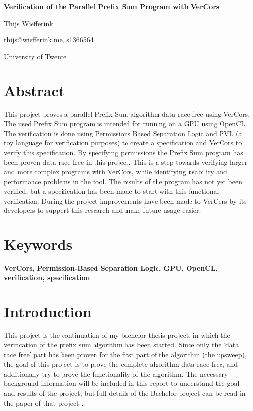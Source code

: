 \documentclass[a4paper]{article}
\begin{document}
\begin{titlepage}
	\begin{center}
		{\huge\bfseries Verification of the Parallel Prefix Sum Program with VerCors\par}
		
		\vspace{1cm}
		{\LARGE Thijs Wiefferink\par}
		{\large thijs@wiefferink.me, s1366564}
		
		\vfill
		
		{\Large
			University of Twente		
		}
	\end{center}

\end{titlepage}
\newpage


\section*{Abstract}
This project proves a parallel Prefix Sum algorithm data race free using VerCors. The used Prefix Sum program is intended for running on a GPU using OpenCL. The verification is done using Permissions Based Separation Logic and PVL (a toy language for verification purposes) to create a specification and VerCors to verify this specification. By specifying permissions the Prefix Sum program has been proven data race free in this project. This is a step towards verifying larger and more complex programs with VerCors, while identifying usability and performance problems in the tool. The results of the program has not yet been verified, but a specification has been made to start with this functional verification. During the project improvements have been made to VerCors by its developers to support this research and make future usage easier.


\section*{Keywords}
\textbf{VerCors, Permission-Based Separation Logic, GPU, OpenCL, verification, specification}


\newpage
\tableofcontents


\section{Introduction}
This project is the continuation of my bachelor thesis project, in which the verification of the prefix sum algorithm has been started. Since only the 'data race free' part has been proven for the first part of the algorithm (the upsweep), the goal of this project is to prove the complete algorithm data race free, and additionally try to prove the functionality of the algorithm. The necessary background information will be included in this report to understand the goal and results of the project, but full details of the Bachelor project can be read in the paper of that project \cite{bachelorThesis}.
\end{document}
